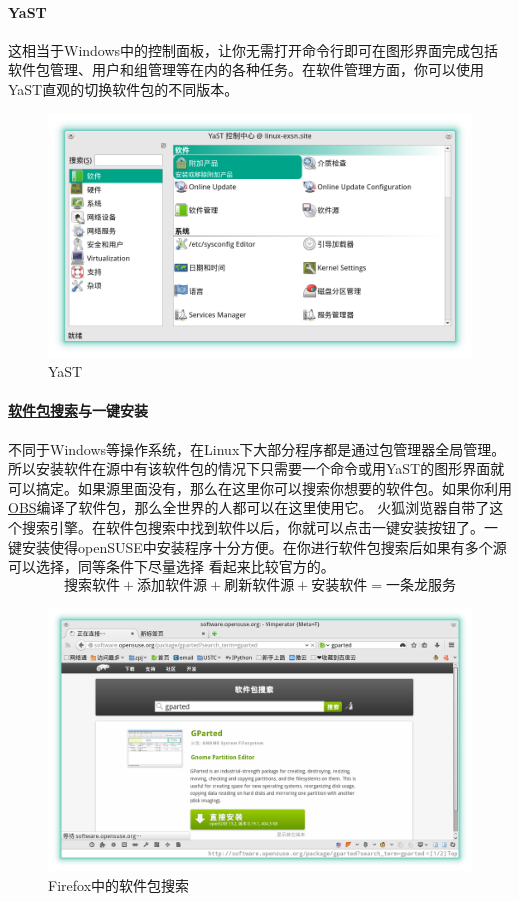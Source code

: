 \paragraph{YaST} 这相当于Windows中的控制面板，让你无需打开命令行即可在图形界面完成包括软件包管理、用户和组管理等在内的各种任务。在软件管理方面，你可以使用YaST直观的切换软件包的不同版本。
\begin{figure}[htbp!]
\centering
\includegraphics[width=\textwidth]{./pic/yast.png} 
\caption{YaST}\label{yast}
\end{figure}

\paragraph[软件包搜索与一键安装]{\href{http://software.opensuse.org/packages}{软件包搜索}与一键安装} 不同于Windows等操作系统，在Linux下大部分程序都是通过包管理器全局管理。所以安装软件在源中有该软件包的情况下只需要一个命令或用YaST的图形界面就可以搞定。如果源里面没有，那么在这里你可以搜索你想要的软件包。如果你利用\href{https://build.opensuse.org/}{OBS}编译了软件包，那么全世界的人都可以在这里使用它。
火狐浏览器自带了这个搜索引擎。在软件包搜索中找到软件以后，你就可以点击一键安装按钮了。一
键安装使得openSUSE中安装程序十分方便。在你进行软件包搜索后如果有多个源可以选择，同等条件下尽量选择
看起来比较官方的。\[\text{搜索软件}+\text{添加软件源}+\text{刷新软件源}+\text{安装软件}=\text{一条龙服务}\]

\begin{figure}[htb]
\centering
\includegraphics[width=\textwidth]{./pic/software.png} 
\caption{Firefox中的软件包搜索}\label{soft}
\end{figure}

